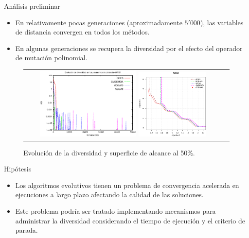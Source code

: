 \documentclass{beamer}
\begin{document}
\begin{frame}{Análisis preliminar}
\begin{itemize}
\justifying
\item En relativamente pocas generaciones (aproximadamente $5'000$), las variables de distancia convergen en todos los métodos.
\justifying
\item En algunas generaciones se recupera la diversidad por el efecto del operador de mutación polinomial.
\end{itemize}

\begin{figure}
\centering
\begin{tabular}{cc}
 \includegraphics[width=0.5\textwidth]{Average_DistanceParamsStateArt.eps} 
\includegraphics[width=0.35\textwidth]{WFG1_analisis.eps} %
\end{tabular}
\caption{Evolución de la diversidad y superficie de alcance al 50\%.}
\label{fig:DiversityProposal}
\end{figure}
\end{frame}


\begin{frame}{Hipótesis}
    \begin{itemize}
        \item Los algoritmos evolutivos tienen un problema de convergencia acelerada en ejecuciones a largo plazo afectando la calidad de las soluciones.
	\item Este problema podría ser tratado implementando mecanismos para administrar la diversidad considerando el tiempo de ejecución y el criterio de parada.
    \end{itemize}
\end{frame}
\end{document}
